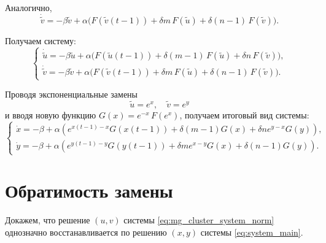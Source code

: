 Аналогично,
\[
\dot{\tilde{v}} = -\beta \tilde{v} + \alpha \big(F(\tilde{v}(t - 1)) + \delta m \, F(\tilde{u}) + \delta (n - 1) \, F(\tilde{v})\big).
\]

Получаем систему:
%
\begin{equation}
	\label{eq:mg_cluster_system_tilde}
	\begin{cases}
		\dot{\tilde{u}} = -\beta \tilde{u} + \alpha \big(F(\tilde{u}(t - 1)) + \delta (m - 1) \, F(\tilde{u}) + \delta n \, F(\tilde{v})\big),\\
		\dot{\tilde{v}} = -\beta \tilde{v} + \alpha \big(F(\tilde{v}(t - 1)) + \delta m \, F(\tilde{u}) + \delta (n - 1) \, F(\tilde{v})\big).
	\end{cases}
\end{equation}

Проводя экспоненциальные замены
\begin{equation}
	\label{eq:exp_change}
	\tilde{u} = e^x, \quad \tilde{v} = e^y
\end{equation}
и вводя новую функцию $G(x) = e^{-x} \, F(e^x)$, получаем итоговый вид системы:
\begin{equation}
	\label{eq:system_main}
	\begin{cases}
		\dot{x} = -\beta + \alpha \left(e^{x(t - 1) - x} G(x(t - 1)) + \delta (m - 1) G(x) + \delta n e^{y - x} G(y)\right),\\
		\dot{y} = -\beta + \alpha \left(e^{y(t - 1) - y} G(y(t - 1)) + \delta m e^{x - y} G(x) + \delta (n - 1) G(y)\right).
	\end{cases}
\end{equation}

\section{Обратимость замены}\label{sec:ch3/sect2}

Докажем, что решение $(u, v)$ системы \eqref{eq:mg_cluster_system_norm} однозначно восстанавливается по решению $(x, y)$ системы \eqref{eq:system_main}.


